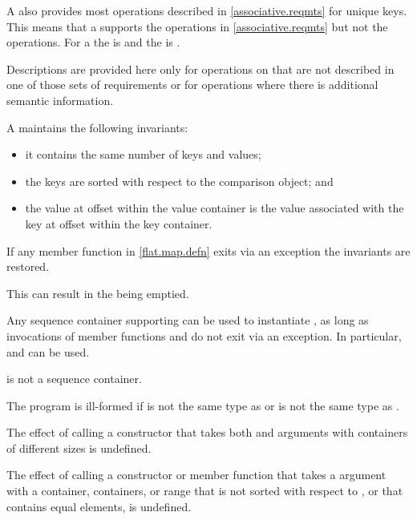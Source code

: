 \pnum
A  also provides most operations
described in \ref{associative.reqmts} for unique keys.
This means that a  supports
the  operations in \ref{associative.reqmts}
but not the  operations.
For a 
the  is  and
the  is .

\pnum
Descriptions are provided here only for operations on  that
are not described in one of those sets of requirements or for operations where
there is additional semantic information.

\pnum
A  maintains the following invariants:
\begin{itemize}
\item
it contains the same number of keys and values;
\item
the keys are sorted with respect to the comparison object; and
\item
the value at offset  within the value container is
the value associated with the key at offset 
within the key container.
\end{itemize}

\pnum
If any member function in \ref{flat.map.defn} exits via an exception
the invariants are restored.
\begin{note}
This can result in the  being emptied.
\end{note}

\pnum
Any sequence container 
supporting  can be used
to instantiate ,
as long as invocations of
member functions  and  do not exit via an exception.
In particular,  and 
can be used.
\begin{note}
 is not a sequence container.
\end{note}

\pnum
The program is ill-formed if
 is not the same type as  or
 is not the same type as .

\pnum
The effect of calling a constructor
that takes
both  and  arguments with
containers of different sizes is undefined.

\pnum
The effect of calling a constructor or member function
that takes a  argument with
a container, containers, or range
that is not sorted with respect to , or
that contains equal elements,
is undefined.

